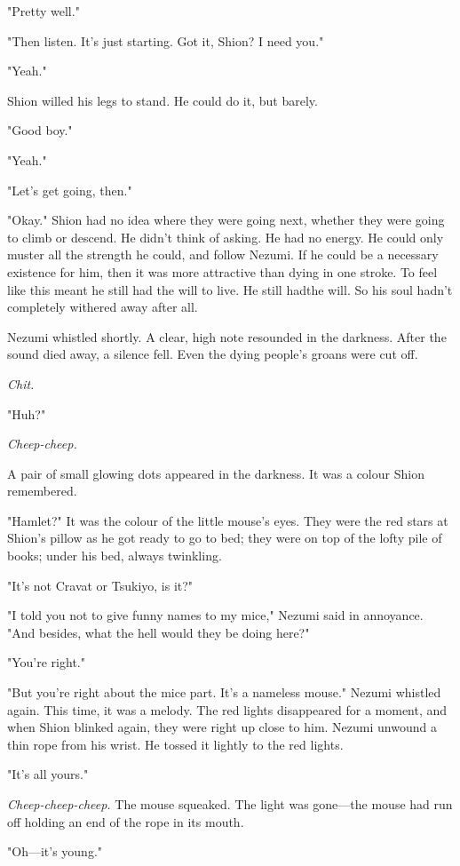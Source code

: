 "Pretty well."

"Then listen. It's just starting. Got it, Shion? I need you."

"Yeah."

Shion willed his legs to stand. He could do it, but barely.

"Good boy."

"Yeah."

"Let's get going, then."

"Okay." Shion had no idea where they were going next, whether they were
going to climb or descend. He didn't think of asking. He had no energy.
He could only muster all the strength he could, and follow Nezumi. If he
could be a necessary existence for him, then it was more attractive than
dying in one stroke. To feel like this meant he still had the will to
live. He still had\el the will. So his soul hadn't completely withered
away after all.

Nezumi whistled shortly. A clear, high note resounded in the darkness.
After the sound died away, a silence fell. Even the dying people's
groans were cut off.

\emph{Chit.}

"Huh?"

\emph{Cheep-cheep.}

A pair of small glowing dots appeared in the darkness. It was a colour
Shion remembered.

"Hamlet?" It was the colour of the little mouse's eyes. They were the
red stars at Shion's pillow as he got ready to go to bed; they were on
top of the lofty pile of books; under his bed, always twinkling.

"It's not Cravat or Tsukiyo, is it\el ?"

"I told you not to give funny names to my mice," Nezumi said in
annoyance. "And besides, what the hell would they be doing here?"

"You're right."

"But you're right about the mice part. It's a nameless mouse." Nezumi
whistled again. This time, it was a melody. The red lights disappeared
for a moment, and when Shion blinked again, they were right up close to
him. Nezumi unwound a thin rope from his wrist. He tossed it lightly to
the red lights.

"It's all yours."

\emph{Cheep-cheep-cheep.} The mouse squeaked. The light was gone---the mouse had
run off holding an end of the rope in its mouth.

"Oh---it's young."

